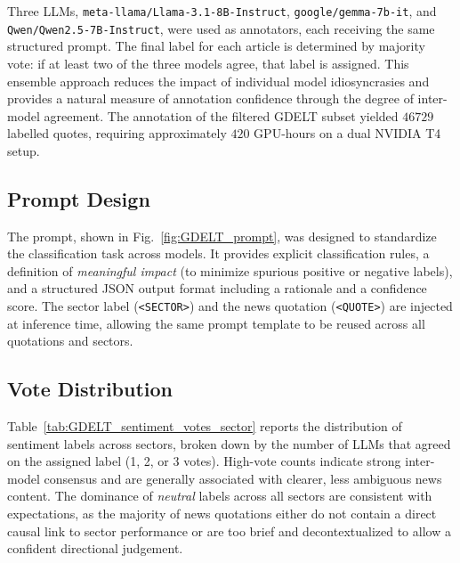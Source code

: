 Three LLMs, \texttt{meta-llama/Llama-3.1-8B-Instruct}, \texttt{google/gemma-7b-it}, and \texttt{Qwen/Qwen2.5-7B-Instruct}, were used as annotators, each receiving the same structured prompt. The final label for each article is determined by majority vote: if at least two of the three models agree, that label is assigned. This ensemble approach reduces the impact of individual model idiosyncrasies and provides a natural measure of annotation confidence through the degree of inter-model agreement. The annotation of the filtered GDELT subset yielded $\num{46729}$ labelled quotes, requiring approximately $\num{420}$ GPU-hours on a dual NVIDIA T4 setup.

\subsection{Prompt Design}
\label{sec:prompt}

The prompt, shown in Fig.~\ref{fig:GDELT_prompt}, was designed to standardize the classification task across models. It provides explicit classification rules, a definition of \textit{meaningful impact} (to minimize spurious positive or negative labels), and a structured JSON output format including a rationale and a confidence score. The sector label (\texttt{<SECTOR>}) and the news quotation (\texttt{<QUOTE>}) are injected at inference time, allowing the same prompt template to be reused across all quotations and sectors.


\subsection{Vote Distribution}
\label{sec:vote_distribution}

Table~\ref{tab:GDELT_sentiment_votes_sector} reports the distribution of sentiment labels across sectors, broken down by the number of LLMs that agreed on the assigned label (1, 2, or 3 votes). High-vote counts indicate strong inter-model consensus and are generally associated with clearer, less ambiguous news content. The dominance of \textit{neutral} labels across all sectors are consistent with expectations, as the majority of news quotations either do not contain a direct causal link to sector performance or are too brief and decontextualized to allow a confident directional judgement.

